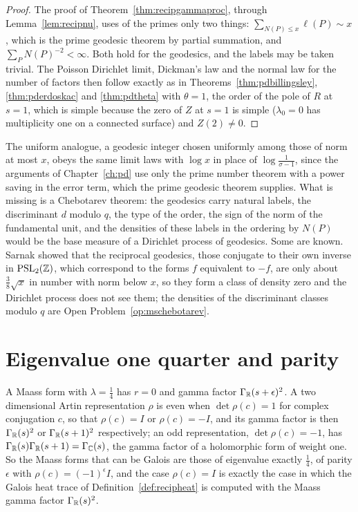 \begin{proof}
The proof of Theorem~\ref{thm:recipgammaproc}, through Lemma~\ref{lem:recipnu}, uses of the primes only two things: $\sum_{N(P)\le x}\ell(P)\sim x$, which is the prime geodesic theorem by partial summation, and $\sum_PN(P)^{-2}<\infty$. Both hold for the geodesics, and the labels may be taken trivial. The Poisson Dirichlet limit, Dickman's law and the normal law for the number of factors then follow exactly as in Theorems~\ref{thm:pdbillingsley}, \ref{thm:pderdoskac} and \ref{thm:pdtheta} with $\theta=1$, the order of the pole of $R$ at $s=1$, which is simple because the zero of $Z$ at $s=1$ is simple ($\lambda_0=0$ has multiplicity one on a connected surface) and $Z(2)\ne0$.
\end{proof}

The uniform analogue, a geodesic integer chosen uniformly among those of norm at most $x$, obeys the same limit laws with $\log x$ in place of $\log\frac1{\sigma-1}$, since the arguments of Chapter~\ref{ch:pd} use only the prime number theorem with a power saving in the error term, which the prime geodesic theorem supplies. What is missing is a Chebotarev theorem: the geodesics carry natural labels, the discriminant $d$ modulo $q$, the type of the order, the sign of the norm of the fundamental unit, and the densities of these labels in the ordering by $N(P)$ would be the base measure of a Dirichlet process of geodesics. Some are known. Sarnak \cite{sarnakreciprocal2007} showed that the reciprocal geodesics, those conjugate to their own inverse in $\mathrm{PSL}_2(\mathbb{Z})$, which correspond to the forms $f$ equivalent to $-f$, are only about $\frac38\sqrt x$ in number with norm below $x$, so they form a class of density zero and the Dirichlet process does not see them; the densities of the discriminant classes modulo $q$ are Open Problem~\ref{op:mschebotarev}.

\section{Eigenvalue one quarter and parity}\label{sec:msquarter}

A Maass form with $\lambda=\frac14$ has $r=0$ and gamma factor $\Gamma_{\mathbb{R}}(s+\epsilon)^2$. A two dimensional Artin representation $\rho$ is even when $\det\rho(c)=1$ for complex conjugation $c$, so that $\rho(c)=I$ or $\rho(c)=-I$, and its gamma factor is then $\Gamma_{\mathbb{R}}(s)^2$ or $\Gamma_{\mathbb{R}}(s+1)^2$ respectively; an odd representation, $\det\rho(c)=-1$, has $\Gamma_{\mathbb{R}}(s)\Gamma_{\mathbb{R}}(s+1)=\Gamma_{\mathbb{C}}(s)$, the gamma factor of a holomorphic form of weight one. So the Maass forms that can be Galois are those of eigenvalue exactly $\frac14$, of parity $\epsilon$ with $\rho(c)=(-1)^\epsilon I$, and the case $\rho(c)=I$ is exactly the case in which the Galois heat trace of Definition~\ref{def:recipheat} is computed with the Maass gamma factor $\Gamma_{\mathbb{R}}(s)^2$.

